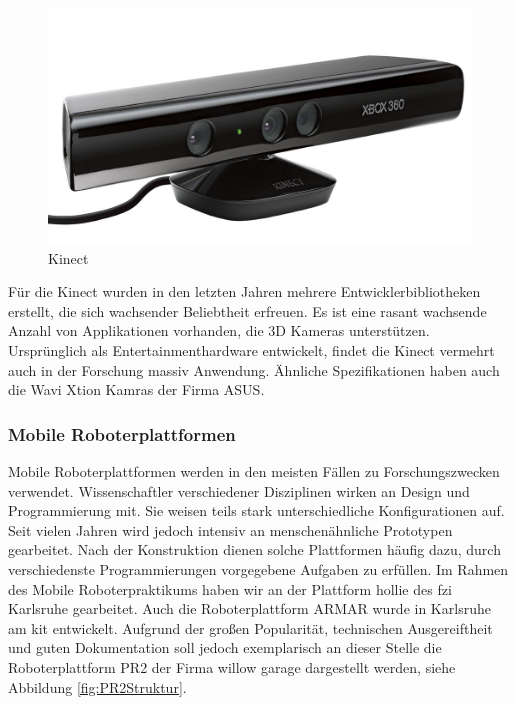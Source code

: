 \begin{figure}[h]
\center
\includegraphics[scale=0.3]{graphics/Kinect.jpg}
\caption{\label{fig:Kinect} Kinect}
\end{figure}

Für die Kinect wurden in den letzten Jahren mehrere Entwicklerbibliotheken erstellt,
 die sich wachsender Beliebtheit erfreuen. Es ist eine rasant wachsende Anzahl von Applikationen vorhanden,
 die 3D Kameras unterstützen. Ursprünglich als Entertainmenthardware entwickelt,
 findet die Kinect vermehrt auch in der Forschung massiv Anwendung.
 Ähnliche Spezifikationen haben auch die Wavi Xtion Kamras der Firma ASUS.

\subsubsection{Mobile Roboterplattformen}

Mobile Roboterplattformen werden in den meisten Fällen zu Forschungszwecken verwendet.
 Wissenschaftler verschiedener Disziplinen wirken an Design und Programmierung mit.
 Sie weisen teils stark unterschiedliche Konfigurationen auf.
 Seit vielen Jahren wird jedoch intensiv an menschenähnliche Prototypen gearbeitet.
 Nach der Konstruktion dienen solche Plattformen häufig dazu, durch verschiedenste Programmierungen
 vorgegebene Aufgaben zu erfüllen. Im Rahmen des Mobile Roboterpraktikums haben
 wir an der Plattform \gls{hollie} des \gls{fzi} Karlsruhe gearbeitet. Auch die
 Roboterplattform ARMAR wurde in Karlsruhe am \gls{kit} entwickelt.
 Aufgrund der großen Popularität, technischen Ausgereiftheit und guten
 Dokumentation soll jedoch exemplarisch an dieser Stelle die Roboterplattform
 PR2 der Firma willow garage dargestellt werden, siehe Abbildung
 \ref{fig:PR2Struktur}.

